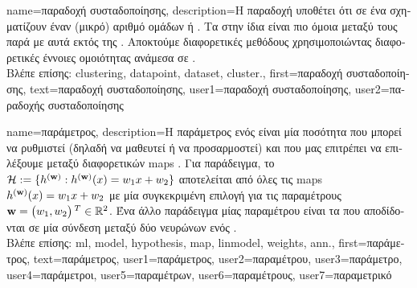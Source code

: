 {name={\foreignlanguage{greek}{παραδοχή συσταδοποίησης}}, 
	description={\foreignlanguage{greek}{Η παραδοχή} 
		 \foreignlanguage{greek}{υποθέτει ότι}  \foreignlanguage{greek}{σε 
		ένα}  \foreignlanguage{greek}{σχηματίζουν έναν (μικρό) αριθμό ομάδων ή} . 
		\foreignlanguage{greek}{Τα}  \foreignlanguage{greek}{στην ίδια}  
		\foreignlanguage{greek}{είναι πιο όμοια μεταξύ τους παρά με αυτά εκτός της}  
		\cite{SemiSupervisedBook}. \foreignlanguage{greek}{Αποκτούμε διαφορετικές μεθόδους}  
		\foreignlanguage{greek}{χρησιμοποιώντας διαφορετικές έννοιες ομοιότητας ανάμεσα σε} .\\
		\foreignlanguage{greek}{Βλέπε επίσης:} \gls{clustering}, \gls{datapoint}, \gls{dataset}, \gls{cluster}.},
	first={\foreignlanguage{greek}{παραδοχή συσταδοποίησης}},
	text={\foreignlanguage{greek}{παραδοχή συσταδοποίησης}},
	user1={\foreignlanguage{greek}{παραδοχή συσταδοποίησης}}, %
	user2={\foreignlanguage{greek}{παραδοχής συσταδοποίησης}} %
}

{name={\foreignlanguage{greek}{παράμετρος}},
	description={\foreignlanguage{greek}{Η παράμετρος ενός}   
		\foreignlanguage{greek}{είναι μία ποσότητα που μπορεί να ρυθμιστεί (δηλαδή να μαθευτεί ή να προσαρμοστεί) και που μας επιτρέπει 
		να επιλέξουμε μεταξύ διαφορετικών} \gls{map}s . \foreignlanguage{greek}{Για παράδειγμα, το}  
		$\mathcal{H} := \{h^{({\bf w})}: h^{({\bf w})}(x)= w_{1} x + w_{2}\}$ 
		\foreignlanguage{greek}{αποτελείται από όλες τις} \gls{map}s  $h^{({\bf w})}(x)= w_{1} x + w_{2}$ 
		\foreignlanguage{greek}{με μία συγκεκριμένη επιλογή για τις παραμέτρους ${\bf w} = \big(w_{1},w_{2}\big)\,^{T} \in \mathbb{R}^{2}$. 
		Ένα άλλο παράδειγμα μίας παραμέτρου}  \foreignlanguage{greek}{είναι τα}  
		\foreignlanguage{greek}{που αποδίδονται σε μία σύνδεση μεταξύ δύο νευρώνων ενός} .\\
		\foreignlanguage{greek}{Βλέπε επίσης:} \gls{ml}, \gls{model}, \gls{hypothesis}, \gls{map}, \gls{linmodel}, \gls{weights}, \gls{ann}.},
	first={\foreignlanguage{greek}{παράμετρος}},
	text={\foreignlanguage{greek}{παράμετρος}},
	user1={\foreignlanguage{greek}{παράμετρος}}, %
	user2={\foreignlanguage{greek}{παραμέτρου}}, %
	user3={\foreignlanguage{greek}{παράμετρο}}, %
	user4={\foreignlanguage{greek}{παράμετροι}}, %
	user5={\foreignlanguage{greek}{παραμέτρων}}, %
	user6={\foreignlanguage{greek}{παραμέτρους}}, %
	user7={\foreignlanguage{greek}{παραμετρικό}} %
}

